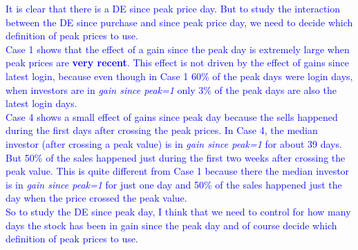  \textcolor{blue}{It is clear that there is a DE since peak price day. But to study the interaction between the DE since purchase and since peak price day, we need to decide which definition of peak prices to use. \\
Case 1 shows that the effect of a gain since the peak day is extremely large when peak prices are \textbf{very recent}. This effect is not driven by the effect of gains since latest login, because even though in Case 1 60\% of the peak days were login days, when investors are in \textit{gain since peak=1} only 3\% of the peak days are also the latest login days. \\
Case 4 shows a small effect of gains since peak day because the sells happened during the first days after crossing the peak prices. In Case 4, the median investor (after crossing a peak value) is in \textit{gain since peak=1} for about 39 days. But 50\% of the sales happened just during the first two weeks after crossing the peak value. This is quite different from Case 1 because there the median investor is in \textit{gain since peak=1} for just one day and 50\% of the sales happened just the day when the price crossed the peak value. \\
So to study the DE since peak day, I think that we need to control for how many days the stock has been in gain since the peak day and of course decide which definition of peak prices to use.}
 




